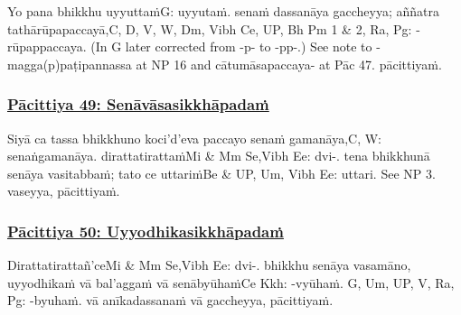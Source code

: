 Yo pana bhikkhu uyyuttaṁ\makeatletter\hyperlink{endnote-appendix}\makeatother G: uyyutaṁ.  senaṁ dassanāya gaccheyya; aññatra tathārūpapaccayā,\makeatletter\hyperlink{endnote-appendix}\makeatother C, D, V, W, Dm, Vibh Ce, UP, Bh Pm 1 & 2, Ra, Pg: -rūpappaccaya. (In G later corrected from -p- to -pp-.) See note to
-magga(p)paṭipannassa at NP 16 and cātumāsapaccaya- at Pāc 47. pācittiyaṁ.




\subsubsection*{\hyperref[exp49]{Pācittiya 49: Senāvāsasikkhāpadaṁ}}
\label{pac49}

Siyā ca tassa bhikkhuno koci'd'eva paccayo senaṁ gamanāya,\makeatletter\hyperlink{endnote-appendix}\makeatother C, W: senaṅgamanāya. dirattatirattaṁ\makeatletter\hyperlink{endnote-appendix}\makeatother Mi & Mm Se,Vibh Ee: dvi-. tena bhikkhunā senāya vasitabbaṁ; tato ce uttariṁ\makeatletter\hyperlink{endnote-appendix}\makeatother Be & UP, Um, Vibh Ee: uttari. See NP 3. vaseyya, pācittiyaṁ.



\subsubsection*{\hyperref[exp50]{Pācittiya 50: Uyyodhikasikkhāpadaṁ}}
\label{pac50}

Dirattatirattañ'ce\makeatletter\hyperlink{endnote-appendix}\makeatother Mi & Mm Se,Vibh Ee: dvi-. bhikkhu senāya vasamāno, uyyodhikaṁ vā bal'aggaṁ vā senābyūhaṁ\makeatletter\hyperlink{endnote-appendix}\makeatother Ce Kkh: -vyūhaṁ. G, Um, UP, V, Ra, Pg: -byuhaṁ. vā anīkadassanaṁ vā gaccheyya, pācittiyaṁ.

